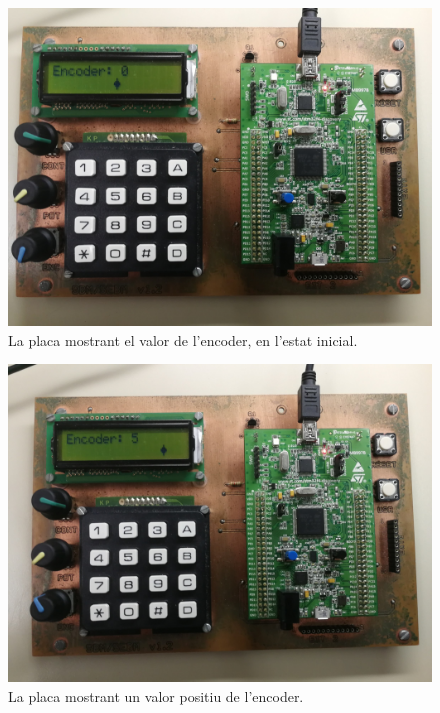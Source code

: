 \begin{figure}[p] %
  \includegraphics[width=.82\columnwidth]{../photos/board/c3-initial}
  \caption{ \label{fig:c3-board-initial} La placa mostrant el valor de l'encoder, en l'estat inicial. }
\end{figure}
\begin{figure}[p]
  \includegraphics[width=.82\columnwidth]{../photos/board/c3-positive}
  \caption{ \label{fig:c3-board-positive} La placa mostrant un valor positiu de l'encoder. }
\end{figure}

